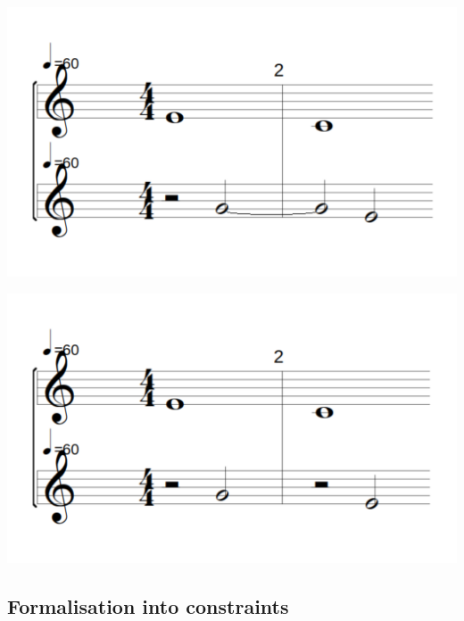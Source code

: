 \begin{enumerate}[wide, label=\bfseries 4.P\arabic*]
    \vspace{.5cm}
    \begin{minipage}{0.46\textwidth}
    \centering
    \includegraphics[width=\textwidth]{Images/hidden-fifths-2.png}
    \label{fig:hidden-fifths-1}
    \end{minipage}
    \hfill
    \begin{minipage}{0.46\textwidth}
      \centering
      \includegraphics[width=\textwidth]{Images/hidden-fifths-1.png}
      \label{fig:hidden-fifths-2}
    \end{minipage}

\end{enumerate}

\subsection{Formalisation into constraints}\label{formalisation-c-4th}
